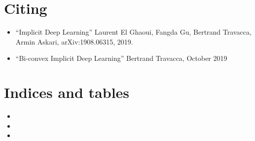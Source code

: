 \documentclass[letterpaper,10pt,english]{sphinxmanual}
\begin{document}
\chapter{Citing}
\label{\detokenize{sections/citing:citing}}\label{\detokenize{sections/citing:id1}}\label{\detokenize{sections/citing::doc}}\begin{itemize}
\item {} 
“Implicit Deep Learning” Laurent El Ghaoui, Fangda Gu, Bertrand Travacca, Armin Askari, arXiv:1908.06315, 2019.

\item {} 
“Bi-convex Implicit Deep Learning” Bertrand Travacca, October 2019

\end{itemize}


\chapter{Indices and tables}
\label{\detokenize{index:indices-and-tables}}\begin{itemize}
\item {} 

\item {} 

\item {} 

\end{itemize}


\renewcommand{\indexname}{Python Module Index}
\begin{sphinxtheindex}
\let\bigletter\sphinxstyleindexlettergroup
\bigletter{u}
\item\relax{}
\item\relax{}
\end{sphinxtheindex}

\renewcommand{\indexname}{Index}
\printindex
\end{document}
